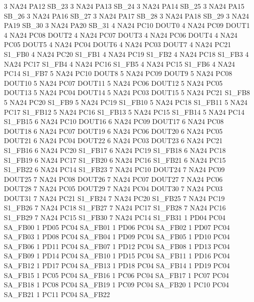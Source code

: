 3   NA24    PA12    SB_23
3   NA24    PA13    SB_24
3   NA24    PA14    SB_25
3   NA24    PA15    SB_26
3   NA24    PA16    SB_27
3   NA24    PA17    SB_28
3   NA24    PA18    SB_29
3   NA24    PA19    SB_30
3   NA24    PA20    SB_31
4   NA24    PC10    DOUT0
4   NA24    PC09    DOUT1
4   NA24    PC08    DOUT2
4   NA24    PC07    DOUT3
4   NA24    PC06    DOUT4
4   NA24    PC05    DOUT5
4   NA24    PC04    DOUT6
4   NA24    PC03    DOUT7
4   NA24    PC21    S1_FB0
4   NA24    PC20    S1_FB1
4   NA24    PC19    S1_FB2
4   NA24    PC18    S1_FB3
4   NA24    PC17    S1_FB4
4   NA24    PC16    S1_FB5
4   NA24    PC15    S1_FB6
4   NA24    PC14    S1_FB7
5   NA24    PC10    DOUT8
5   NA24    PC09    DOUT9
5   NA24    PC08    DOUT10
5   NA24    PC07    DOUT11
5   NA24    PC06    DOUT12
5   NA24    PC05    DOUT13
5   NA24    PC04    DOUT14
5   NA24    PC03    DOUT15
5   NA24    PC21    S1_FB8
5   NA24    PC20    S1_FB9
5   NA24    PC19    S1_FB10
5   NA24    PC18    S1_FB11
5   NA24    PC17    S1_FB12
5   NA24    PC16    S1_FB13
5   NA24    PC15    S1_FB14
5   NA24    PC14    S1_FB15
6   NA24    PC10    DOUT16
6   NA24    PC09    DOUT17
6   NA24    PC08    DOUT18
6   NA24    PC07    DOUT19
6   NA24    PC06    DOUT20
6   NA24    PC05    DOUT21
6   NA24    PC04    DOUT22
6   NA24    PC03    DOUT23
6   NA24    PC21    S1_FB16
6   NA24    PC20    S1_FB17
6   NA24    PC19    S1_FB18
6   NA24    PC18    S1_FB19
6   NA24    PC17    S1_FB20
6   NA24    PC16    S1_FB21
6   NA24    PC15    S1_FB22
6   NA24    PC14    S1_FB23
7   NA24    PC10    DOUT24
7   NA24    PC09    DOUT25
7   NA24    PC08    DOUT26
7   NA24    PC07    DOUT27
7   NA24    PC06    DOUT28
7   NA24    PC05    DOUT29
7   NA24    PC04    DOUT30
7   NA24    PC03    DOUT31
7   NA24    PC21    S1_FB24
7   NA24    PC20    S1_FB25
7   NA24    PC19    S1_FB26
7   NA24    PC18    S1_FB27
7   NA24    PC17    S1_FB28
7   NA24    PC16    S1_FB29
7   NA24    PC15    S1_FB30
7   NA24    PC14    S1_FB31
1   PD04    PC04    SA_FB00
1   PD05    PC04    SA_FB01
1   PD06    PC04    SA_FB02
1   PD07    PC04    SA_FB03
1   PD08    PC04    SA_FB04
1   PD09    PC04    SA_FB05
1   PD10    PC04    SA_FB06
1   PD11    PC04    SA_FB07
1   PD12    PC04    SA_FB08
1   PD13    PC04    SA_FB09
1   PD14    PC04    SA_FB10
1   PD15    PC04    SA_FB11
1   PD16    PC04    SA_FB12
1   PD17    PC04    SA_FB13
1   PD18    PC04    SA_FB14
1   PD19    PC04    SA_FB15
1   PC05    PC04    SA_FB16
1   PC06    PC04    SA_FB17
1   PC07    PC04    SA_FB18
1   PC08    PC04    SA_FB19
1   PC09    PC04    SA_FB20
1   PC10    PC04    SA_FB21
1   PC11    PC04    SA_FB22
